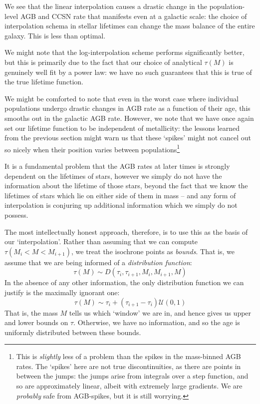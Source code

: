 \documentclass[a4paper,11pt]{article}
\begin{document}
		We see that the linear interpolation causes a drastic change in the population-level AGB and CCSN rate that manifests even at a galactic scale: the choice of interpolation schema in stellar lifetimes can change the mass balance of the entire galaxy. This is less than optimal. 

		We might note that the log-interpolation scheme performs significantly better, but this is primarily due to the fact that our choice of analytical $\tau(M)$ is genuinely well fit by a power law: we have no such guarantees that this is true of the true lifetime function.

		We might be comforted to note that even in the worst case where individual populations undergo drastic changes in AGB rate as a function of their age, this smooths out in the galactic AGB rate. However, we note that we have once again set our lifetime function to be independent of metallicity: the lessons learned from the previous section might warn us that these `spikes' might not cancel out so nicely when their position varies between populations\footnote{This is \textit{slightly} less of a problem than the spikes in the mass-binned AGB rates. The `spikes' here are not true discontinuities, as there are points in between the jumps: the jumps arise from integrals over a step function, and so are approximately linear, albeit with extremely large gradients. We are \textit{probably} safe from AGB-spikes, but it is still worrying.}

		It is a fundamental problem that the AGB rates at later times is strongly dependent on the lifetimes of stars, however we simply do not have the information about the lifetime of those stars, beyond the fact that we know the lifetimes of stars which lie on either side of them in mass -- and any form of interpolation is conjuring up additional information which we simply do not possess. 

		The most intellectually honest approach, therefore, is to use this as the basis of our `interpolation'. Rather than assuming that we can compute $\tau(M_i < M < M_{i+1})$, we treat the isochrone points as \textit{bounds}. That is, we assume that we are being informed of a \textit{distribution function}:
		\begin{equation}
			\tau(M) \sim  D(\tau_{i},\tau_{i+1},M_{i},M_{i+1},M)
		\end{equation}
		In the absence of any other information, the only distribution function we can justify is the maximally ignorant one:
		\begin{equation}
			\tau(M) \sim \tau_i + (\tau_{i+1} - \tau_i) \mathcal{U}(0,1)
		\end{equation}
		That is, the mass $M$ tells us which `window' we are in, and hence gives us upper and lower bounds on $\tau$. Otherwise, we have no information, and so the age is uniformly distributed between these bounds.
\end{document}
